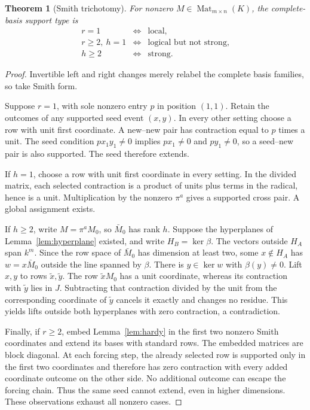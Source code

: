 \documentclass[11pt]{article}
\newtheorem{theorem}{Theorem}[section]
\theoremstyle{definition}\newtheorem{definition}[theorem]{Definition}
\theoremstyle{remark}\newtheorem{remark}[theorem]{Remark}
\DeclareMathOperator{\Mat}{Mat}
\begin{document}
\begin{theorem}[Smith trichotomy]\label{thm:trichotomy}
For nonzero $M\in\Mat_{m\times n}(K)$, the complete-basis support type is
\[
\begin{array}{rcl}
r=1&\Longleftrightarrow&\text{local},\\
r\geq2,\ h=1&\Longleftrightarrow&\text{logical but not strong},\\
h\geq2&\Longleftrightarrow&\text{strong}.
\end{array}
\]
\end{theorem}
\begin{proof}
Invertible left and right changes merely relabel the complete basis families, so take Smith form.

Suppose $r=1$, with sole nonzero entry $p$ in position $(1,1)$. Retain the outcomes of any supported seed event $(x,y)$. In every other setting choose a row with unit first coordinate. A new--new pair has contraction equal to $p$ times a unit. The seed condition $px_1y_1\ne0$ implies $px_1\ne0$ and $py_1\ne0$, so a seed--new pair is also supported. The seed therefore extends.

If $h=1$, choose a row with unit first coordinate in every setting. In the divided matrix, each selected contraction is a product of units plus terms in the radical, hence is a unit. Multiplication by the nonzero $\pi^a$ gives a supported cross pair. A global assignment exists.

If $h\geq2$, write $M=\pi^a M_0$, so $\bar M_0$ has rank $h$. Suppose the hyperplanes of Lemma~\ref{lem:hyperplane} existed, and write $H_B=\ker\beta$. The vectors outside $H_A$ span $k^m$. Since the row space of $\bar M_0$ has dimension at least two, some $x\notin H_A$ has $w=x\bar M_0$ outside the line spanned by $\beta$. There is $y\in\ker w$ with $\beta(y)\ne0$. Lift $x,y$ to rows $\tilde x,\tilde y$. The row $\tilde xM_0$ has a unit coordinate, whereas its contraction with $\tilde y$ lies in $J$. Subtracting that contraction divided by the unit from the corresponding coordinate of $\tilde y$ cancels it exactly and changes no residue. This yields lifts outside both hyperplanes with zero contraction, a contradiction.

Finally, if $r\geq2$, embed Lemma~\ref{lem:hardy} in the first two nonzero Smith coordinates and extend its bases with standard rows. The embedded matrices are block diagonal. At each forcing step, the already selected row is supported only in the first two coordinates and therefore has zero contraction with every added coordinate outcome on the other side. No additional outcome can escape the forcing chain. Thus the same seed cannot extend, even in higher dimensions. These observations exhaust all nonzero cases.
\end{proof}
\end{document}
